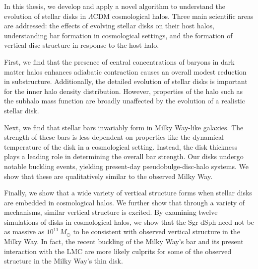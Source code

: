 In this thesis, we develop and apply a novel algorithm to understand 
the evolution of stellar disks in $\Lambda$CDM cosmological halos.
Three main scientific areas are addressed: the effects of evolving stellar
disks on their host halos, understanding bar formation in cosmological settings,
and the formation of vertical disc structure in response to the host halo.

First, we find that the presence of central concentrations of baryons in dark 
matter halos enhances adiabatic contraction causes an overall modest 
reduction in substructure. Additionally, the detailed evolution of stellar disks 
is important for the inner halo density distribution. However,
properties of the halo such as the subhalo mass function are broadly unaffected
by the evolution of a realistic stellar disk.


Next, we find that stellar bars invariably form in Milky Way-like galaxies. The 
strength of these bars is less dependent on properties like the dynamical
temperature of the disk in a cosmological setting. Instead, the disk thickness
plays a leading role in determining the overall bar strength. Our disks
undergo notable buckling events, yielding present-day pseudobulge-disc-halo
systems. We show that these are qualitatively similar to the observed Milky Way.

Finally, we show that a wide variety of vertical structure forms when 
stellar disks are embedded in cosmological halos. We further show that through
a variety of mechanisms, similar vertical structure is excited. By examining
twelve simulations of disks in cosmological halos, we show that the Sgr dSph
need not be as massive as $10^{11}\,M_\odot$ to be consistent with observed
vertical structure in the Milky Way. In fact, the recent buckling of the Milky Way's
bar and its present interaction with the LMC are more likely culprits for some of
the observed structure in the Milky Way's thin disk.